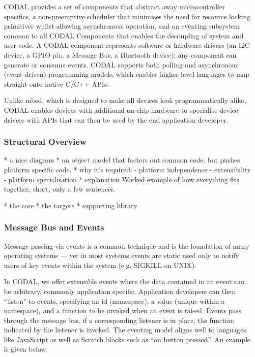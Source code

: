 CODAL provides a set of components that abstract away microcontroller specifics, a non-preemptive scheduler that minimises the need for resource locking primitives whilst allowing asynchronous operation, and an eventing subsystem common to all CODAL Components that enables the decoupling of system and user code. A CODAL component represents software or hardware drivers (an I2C device, a GPIO pin, a Message Bus, a Bluetooth device); any component can generate or consume events. CODAL supports both polling and asynchronous (event-driven) programming models, which enables higher level languages to map straight onto native C/C++ APIs.

Unlike mbed, which is designed to make all devices look programmatically alike, CODAL enables devices with additional on-chip hardware to specialise device drivers with APIs that can then be used by the end application developer.


\subsubsection{Structural Overview}

* a nice diagram
* an object model that factors out common code, but pushes platform specific code.
* why it's required:
    - platform independence
    - extensibility
    - platform specialisation
* explanation
Worked example of how everything fits together, short, only a few sentences.

* the core
* the targets
* supporting library

\subsubsection{Message Bus and Events}

Message passing via events is a common technique and is the foundation of many operating systems --- yet in most systems events are static used only to notify users of key events within the system (e.g. SIGKILL on UNIX).

In CODAL, we offer extensible events where the data contained in an event can be arbitrary, commonly application specific. Application developers can then ``listen'' to events, specifying an id (namespace), a value (unique within a namespace), and a function to be invoked when an event is raised. Events pass through the message bus, if a corresponding listener is in place, the function indicated by the listener is invoked. The eventing model aligns well to languages like JavaScript as well as Scratch blocks such as ``on button pressed''. An example is given below:

